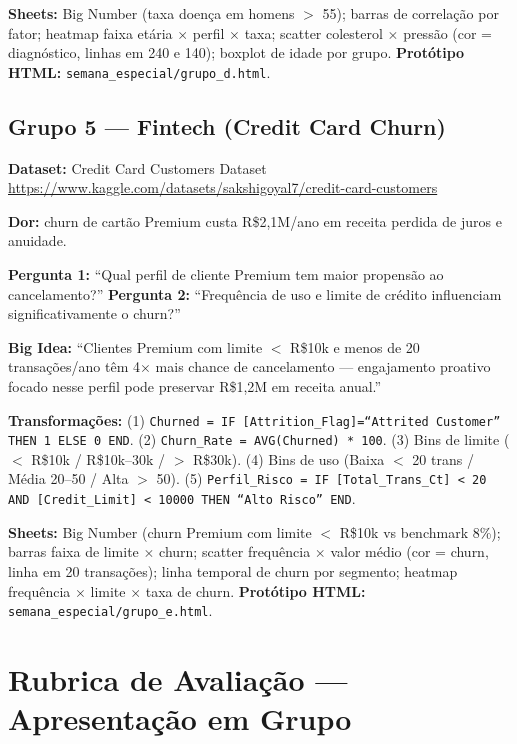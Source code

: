 \textbf{Sheets:} Big Number (taxa doença em homens $>$ 55); barras de correlação por fator; heatmap faixa etária $\times$ perfil $\times$ taxa; scatter colesterol $\times$ pressão (cor = diagnóstico, linhas em 240 e 140); boxplot de idade por grupo. \textbf{Protótipo HTML:} \texttt{semana\_especial/grupo\_d.html}.

\subsection{Grupo 5 --- Fintech (Credit Card Churn)}

\textbf{Dataset:} Credit Card Customers Dataset\\
\url{https://www.kaggle.com/datasets/sakshigoyal7/credit-card-customers}

\textbf{Dor:} churn de cartão Premium custa R\$2,1M/ano em receita perdida de juros e anuidade.

\textbf{Pergunta 1:} ``Qual perfil de cliente Premium tem maior propensão ao cancelamento?'' \quad \textbf{Pergunta 2:} ``Frequência de uso e limite de crédito influenciam significativamente o churn?''

\textbf{Big Idea:} ``Clientes Premium com limite $<$ R\$10k e menos de 20 transações/ano têm 4$\times$ mais chance de cancelamento --- engajamento proativo focado nesse perfil pode preservar R\$1,2M em receita anual.''

\textbf{Transformações:} (1) \texttt{Churned = IF [Attrition\_Flag]=``Attrited Customer'' THEN 1 ELSE 0 END}. (2) \texttt{Churn\_Rate = AVG(Churned) * 100}. (3) Bins de limite ($<$ R\$10k / R\$10k--30k / $>$ R\$30k). (4) Bins de uso (Baixa $<$ 20 trans / Média 20--50 / Alta $>$ 50). (5) \texttt{Perfil\_Risco = IF [Total\_Trans\_Ct] < 20 AND [Credit\_Limit] < 10000 THEN ``Alto Risco'' END}.

\textbf{Sheets:} Big Number (churn Premium com limite $<$ R\$10k vs benchmark 8\%); barras faixa de limite $\times$ churn; scatter frequência $\times$ valor médio (cor = churn, linha em 20 transações); linha temporal de churn por segmento; heatmap frequência $\times$ limite $\times$ taxa de churn. \textbf{Protótipo HTML:} \texttt{semana\_especial/grupo\_e.html}.

\section{Rubrica de Avaliação --- Apresentação em Grupo}

